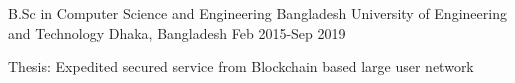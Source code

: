 

\begin{cventries}

  \cventry
    {B.Sc in Computer Science and Engineering} %
    {Bangladesh University of Engineering and Technology} %
    {Dhaka, Bangladesh} %
    {Feb 2015-Sep 2019} %
    {
      \begin{cvitems} %
        \item {Thesis: Expedited secured service from Blockchain based large user network}
      \end{cvitems}
    }

\end{cventries}

